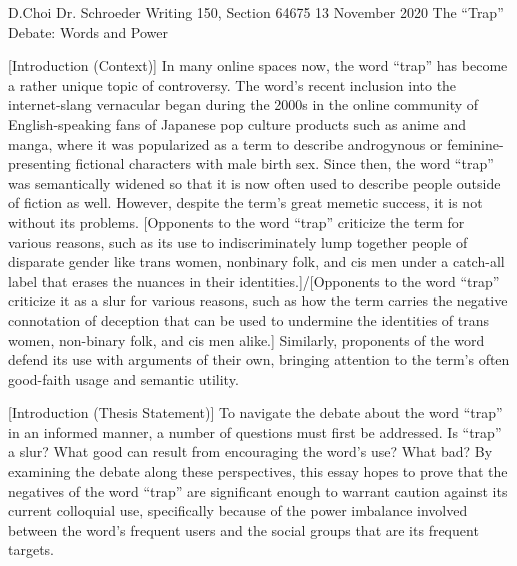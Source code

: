 \documentclass[12pt, letterpaper]{article}
\begin{document}
\begin{mla}
	{D.}{Choi}
	{Dr. Schroeder}
	{Writing 150, Section 64675}
	{13 November 2020}
	{The ``Trap'' Debate: Words and Power}


[Introduction (Context)]
In many online spaces now, the word ``trap'' has become a rather unique topic
of controversy. The word's recent inclusion into the internet-slang vernacular
began during the 2000s in the online community of English-speaking fans of
Japanese pop culture products such as anime and manga, where it was
popularized as a term to describe androgynous or feminine-presenting fictional
characters with male birth sex. Since then, the word ``trap'' was semantically
widened so that it is now often used to describe people outside of fiction as
well. However, despite the term's great memetic success, it is not without its
problems. [Opponents to the word ``trap'' criticize the term for various
reasons, such as its use to indiscriminately lump together people of disparate
gender like trans women, nonbinary folk, and cis men under a catch-all label
that erases the nuances in their identities.]/[Opponents to the word ``trap''
criticize it as a slur for various reasons, such as how the term carries the
negative connotation of deception that can be used to undermine the identities
of trans women, non-binary folk, and cis men alike.] Similarly, proponents of
the word defend its use with arguments of their own, bringing attention to the
term's often good-faith usage and semantic utility.

[Introduction (Thesis Statement)]
To navigate the debate about the word ``trap'' in an informed manner, a number
of questions must first be addressed. Is ``trap'' a slur? What good can result
from encouraging the word's use? What bad? By examining the debate along these
perspectives, this essay hopes to prove that the negatives of the word
``trap'' are significant enough to warrant caution against its current
colloquial use, specifically because of the power imbalance involved between
the word's frequent users and the social groups that are its frequent targets.


\begin{workscited}
\end{workscited}


\end{mla}
\end{document}
